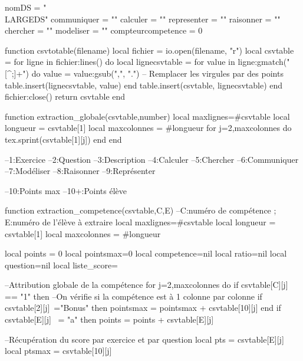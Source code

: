 \documentclass{article}
\begin{document}

    
    \begin{luacode*}
    nomDS = "\\LARGE{DS}"
    communiquer = ""
    calculer = ""
    representer = ""
    raisonner = ""
    chercher = ""
    modeliser = ""
    compteurcompetence = 0
    
    function csvtotable(filename)
        local fichier = io.open(filename, "r")
        local csvtable = {}
        for ligne in fichier:lines() do
            local lignecsvtable = {}
            for value in ligne:gmatch("[^;]+") do
                value = value:gsub(",", ".")  -- Remplacer les virgules par des points
                table.insert(lignecsvtable, value) 
            end
            table.insert(csvtable, lignecsvtable) 
        end
        fichier:close()
        return csvtable
    end
    
    
    
    function extraction_globale(csvtable,number)
       local maxlignes=#csvtable
       local longueur = csvtable[1]
       local maxcolonnes = #longueur
       for j=2,maxcolonnes do
          tex.sprint(csvtable[1][j])
       end
    end
    
    --1:Exercice
    --2:Question
    --3:Description
    --4:Calculer
    --5:Chercher
    --6:Communiquer
    --7:Modéliser
    --8:Raisonner
    --9:Représenter
    
    --10:Points max
    --10+:Points élève
    
    function extraction_competence(csvtable,C,E) --C:numéro de compétence ; E:numéro de l'élève à extraire
        local maxlignes=#csvtable
        local longueur = csvtable[1]
        local maxcolonnes = #longueur
    
        local points = 0
        local pointsmax=0
        local competence=nil
        local ratio=nil
        local question=nil
        local liste_score={}
    
    
        --Attribution globale de la compétence
        for j=2,maxcolonnes do
            if csvtable[C][j] == "1" then --On vérifie si la compétence est à 1 colonne par colonne
                if csvtable[2][j]~="Bonus" then
                    pointsmax = pointsmax + csvtable[10][j]
                end
                if csvtable[E][j] ~= "a" then
                    points = points + csvtable[E][j]
    
                    --Récupération du score par exercice et par question
                    local pts = csvtable[E][j]
                    local ptsmax = csvtable[10][j]
    

\end{luacode*}
\end{document}
